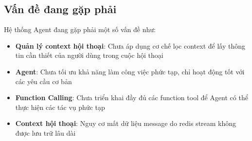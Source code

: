 \subsection{Vấn đề đang gặp phải}

Hệ thống Agent đang gặp phải một số vấn đề như:

\begin{itemize}
    \item \textbf{Quản lý context hội thoại}: Chưa áp dụng cơ chế lọc context để lấy thông tin cần thiết của người dùng trong cuộc hội thoại

    \item \textbf{Agent}: Chưa tối ưu khả năng làm công việc phức tạp, chỉ hoạt động tốt với các yêu cầu cơ bản

    \item \textbf{Function Calling}: Chưa triển khai đầy đủ các function tool để Agent có thể thực hiện các tác vụ phức tạp
    \item \textbf{Context hội thoại}: Nguy cơ mất dữ liệu message do redis stream không được lưu trữ lâu dài
    
\end{itemize}






